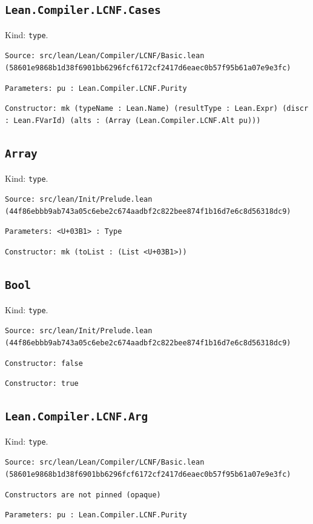 \documentclass[11pt]{article}
\begin{document}
\subsection*{\texttt{Lean.Compiler.LCNF.Cases}}
\noindent Kind: \texttt{type}.\par
\noindent \texttt{Source: src/lean/Lean/Compiler/LCNF/Basic.lean (58601e9868b1d38f6901bb6296fcf6172cf2417d6eaec0b57f95b61a07e9e3fc)}\par
\noindent \texttt{Parameters: pu : Lean.Compiler.LCNF.Purity}\par
\noindent \texttt{Constructor: mk (typeName : Lean.Name) (resultType : Lean.Expr) (discr : Lean.FVarId) (alts : (Array (Lean.Compiler.LCNF.Alt pu)))}\par
\subsection*{\texttt{Array}}
\noindent Kind: \texttt{type}.\par
\noindent \texttt{Source: src/lean/Init/Prelude.lean (44f86ebbb9ab743a05c6ebe2c674aadbf2c822bee874f1b16d7e6c8d56318dc9)}\par
\noindent \texttt{Parameters: <U+03B1> : Type}\par
\noindent \texttt{Constructor: mk (toList : (List <U+03B1>))}\par
\subsection*{\texttt{Bool}}
\noindent Kind: \texttt{type}.\par
\noindent \texttt{Source: src/lean/Init/Prelude.lean (44f86ebbb9ab743a05c6ebe2c674aadbf2c822bee874f1b16d7e6c8d56318dc9)}\par
\noindent \texttt{Constructor: false }\par
\noindent \texttt{Constructor: true }\par
\subsection*{\texttt{Lean.Compiler.LCNF.Arg}}
\noindent Kind: \texttt{type}.\par
\noindent \texttt{Source: src/lean/Lean/Compiler/LCNF/Basic.lean (58601e9868b1d38f6901bb6296fcf6172cf2417d6eaec0b57f95b61a07e9e3fc)}\par
\noindent \texttt{Constructors are not pinned (opaque)}\par
\noindent \texttt{Parameters: pu : Lean.Compiler.LCNF.Purity}\par
\end{document}
